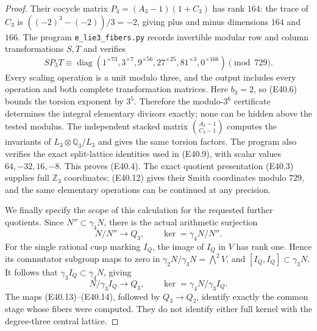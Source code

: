\begin{proof}
Their cocycle matrix $P_3=(A_3-1)(1+C_3)$ has rank
$164$: the trace of $C_3$ is
$((-2)^3-(-2))/3=-2$, giving plus and minus dimensions
$164$ and $166$. The program
\texttt{e\_lie3\_fibers.py} records invertible modular
row and column transformations $S,T$ and verifies
\[
 SP_3T\equiv
 \operatorname{diag}(1^{\times73},3^{\times7},
 9^{\times56},27^{\times25},81^{\times3},0^{\times166})
       \pmod{729}.
 \tag{E40.12}
\]
Every scaling operation is a unit modulo three, and
the output includes every operation and both complete
transformation matrices. Here $b_3=2$, so (E40.6)
bounds the torsion exponent by $3^5$. Therefore the
modulo-$3^6$ certificate determines the integral
elementary divisors exactly; none can be hidden above
the tested modulus. The independent stacked matrix
$\binom{A_3-1}{C_3-1}$ computes the invariants of
$L_3\otimes\mathbb Q_3/L_3$ and gives the same
torsion factors. The program also verifies the exact
split-lattice identities used in (E40.9), with scalar
values $64,-32,16,-8$. This proves (E40.4).
The exact quotient presentation (E40.3) supplies full
$\mathbb Z_3$ coordinates; (E40.12) gives their Smith
coordinates modulo $729$, and the same elementary
operations can be continued at any precision.

We finally specify the scope of this calculation
for the requested further quotients. Since
$N''\subset\gamma_4N$, there is the actual arithmetic
surjection
\[
 N/N''\longrightarrow Q_3,
       \qquad\ker=\gamma_4N/N''.
 \tag{E40.13}
\]
For the single rational cusp marking $I_Q$, the image
of $I_Q$ in $V$ has rank one. Hence its commutator
subgroup maps to zero in
$\gamma_2N/\gamma_3N=\bigwedge^2V$, and
$[I_Q,I_Q]\subset\gamma_3N$.
It follows that $\gamma_3I_Q\subset\gamma_4N$, giving
\[
 N/\gamma_3I_Q\longrightarrow Q_3,
       \qquad\ker=\gamma_4N/\gamma_3I_Q.
 \tag{E40.14}
\]
The maps (E40.13)--(E40.14), followed by $Q_3\to Q_2$,
identify exactly the common stage whose fibers were
computed. They do not identify either full kernel
with the degree-three central lattice.
\end{proof}
